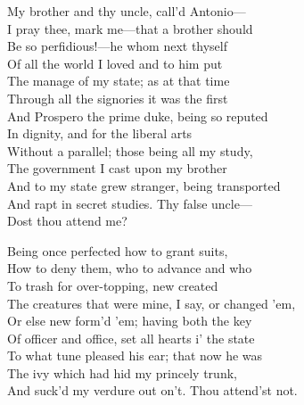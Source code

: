 \begin{verse_speech}[Prospero] 
My brother and thy uncle, call'd Antonio—\\
I pray thee, mark me—that a brother should\\
Be so perfidious!—he whom next thyself\\
Of all the world I loved and to him put\\
The manage of my state; as at that time\\
Through all the signories it was the first\\
And Prospero the prime duke, being so reputed\\
In dignity, and for the liberal arts\\
Without a parallel; those being all my study,\\
The government I cast upon my brother\\
And to my state grew stranger, being transported\\
And rapt in secret studies. Thy false uncle—\\
Dost thou attend me?
\end{verse_speech}

	
\begin{verse_speech}[Prospero] 
Being once perfected how to grant suits,\\
How to deny them, who to advance and who\\
To trash for over-topping, new created\\
The creatures that were mine, I say, or changed 'em,\\
Or else new form'd 'em; having both the key\\
Of officer and office, set all hearts i' the state\\
To what tune pleased his ear; that now he was\\
The ivy which had hid my princely trunk,\\
And suck'd my verdure out on't. Thou attend'st not.
\end{verse_speech}

	
